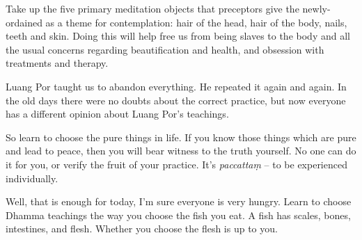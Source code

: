 Take up the five primary meditation objects that preceptors give the
newly-ordained as a theme for contemplation: hair of the head, hair of
the body, nails, teeth and skin. Doing this will help free us from being
slaves to the body and all the usual concerns regarding beautification
and health, and obsession with treatments and therapy. 

Luang Por taught us to abandon everything. He repeated it again and
again. In the old days there were no doubts about the correct practice, 
but now everyone has a different opinion about Luang Por's teachings. 

So learn to choose the pure things in life. If you know those things
which are pure and lead to peace, then you will bear witness to the
truth yourself. No one can do it for you, or verify the fruit of your
practice. It's \emph{paccattaṃ} -- to be experienced individually. 

Well, that is enough for today, I'm sure everyone is very hungry. Learn
to choose Dhamma teachings the way you choose the fish you eat. A fish
has scales, bones, intestines, and flesh. Whether you choose the flesh
is up to you. 

